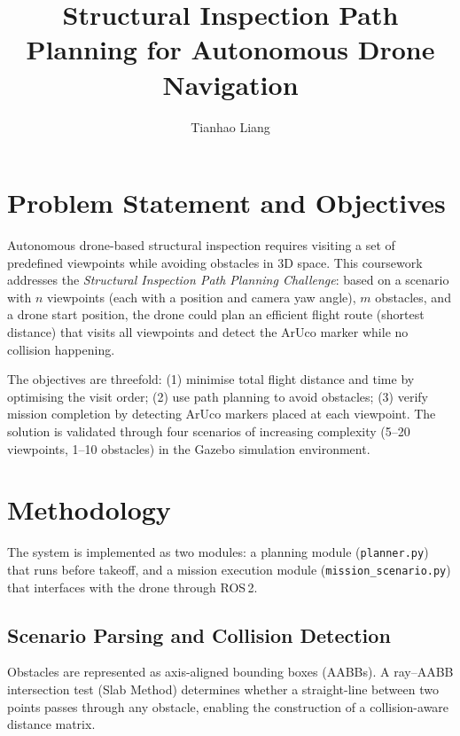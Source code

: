 \documentclass[11pt,a4paper]{article}
\title{\textbf{Structural Inspection Path Planning for Autonomous Drone Navigation}}
\author{Tianhao Liang}
\date{}
\begin{document}
\maketitle

\section{Problem Statement and Objectives}

Autonomous drone-based structural inspection requires visiting a set of predefined viewpoints while avoiding obstacles in 3D space. This coursework addresses the \textit{Structural Inspection Path Planning Challenge}: based on a scenario with $n$ viewpoints (each with a position and camera yaw angle), $m$ obstacles, and a drone start position, the drone could plan an efficient flight route (shortest distance) that visits all viewpoints and detect the ArUco marker while no collision happening.

The objectives are threefold: (1) minimise total flight distance and time by optimising the visit order; (2) use path planning to avoid obstacles; (3) verify mission completion by detecting ArUco markers placed at each viewpoint. The solution is validated through four scenarios of increasing complexity (5--20 viewpoints, 1--10 obstacles) in the Gazebo simulation environment.

\section{Methodology}

The system is implemented as two modules: a planning module (\texttt{planner.py}) that runs before takeoff, and a mission execution module (\texttt{mission\_scenario.py}) that interfaces with the drone through ROS\,2.

\subsection{Scenario Parsing and Collision Detection}

Obstacles are represented as axis-aligned bounding boxes (AABBs). A ray--AABB intersection test (Slab Method) determines whether a straight-line  between two points passes through any obstacle, enabling the construction of a collision-aware distance matrix.
\end{document}

